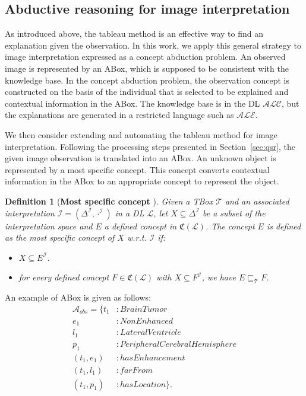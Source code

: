 \documentclass{article}
\newtheorem{mydef}{Definition}
\begin{document}
\subsection{Abductive reasoning for image interpretation}
As introduced above, the tableau method is an effective way to find an explanation given the observation.
In this work, we apply this general strategy to image interpretation expressed as a concept abduction problem.
An observed image is represented by an ABox, which is supposed to be consistent with the knowledge base. 
In the concept abduction problem, the observation concept is constructed on the basis of the individual that is selected to be explained and
contextual information in the ABox.
The knowledge base is in the DL $\mathcal{ALC}$, but the explanations are generated in a restricted language such as $\mathcal{ALE}$.

We then consider extending and automating the tableau method for image interpretation.
Following the processing steps presented in Section~\ref{sec:qsr}, the given image observation is translated into an ABox.
An unknown object is represented by a most specific concept. 
This concept converts contextual information in the ABox to an appropriate concept to represent the object.
\begin{mydef}[\textbf{Most specific concept} \cite{atif2014explanatory}]
Given a TBox $\mathcal{T}$ and an associated interpretation $\mathcal{I}=(\Delta^{\mathcal{I}}, \cdot^{\mathcal{I}})$ in a DL $\mathcal{L}$,
let $X\subseteq \Delta^{\mathcal{I}}$ be a subset of the interpretation space and $E$ a defined concept in $\mathfrak{C}(\mathcal{L})$. 
The concept $E$ is defined as the most specific concept of $X$ w.r.t. $\mathcal{I}$ if:
\begin{itemize}
 \item $X \subseteq E^{\mathcal{I}}$.
 \item for every defined concept $F\in\mathfrak{C}(\mathcal{L})$ with $X \subseteq F^{\mathcal{I}}$, we have $E \sqsubseteq_{\mathcal{T}} F$.
\end{itemize}
\label{def:msc}
\end{mydef}

An example of ABox is given as follows:
\begin{align*}
\mathcal{A}_{obs} =\{t_1&: BrainTumor\\
 e_1&: NonEnhanced\\
 l_1&: LateralVentricle\\
 p_1&: PeripheralCerebralHemisphere\\
 (t_1, e_1)&:hasEnhancement\\
 (t_1, l_1)&:farFrom\\
 (t_1, p_1)&:hasLocation\}.
\end{align*}
\end{document}
